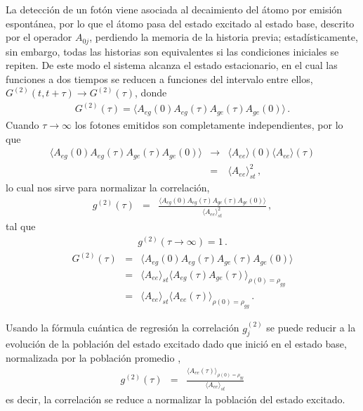 \documentclass[twocolumn,aps,eqsecnum,showkeys,amsmath]{revtex4}
\begin{document}
La detecci\'on de un fot\'on viene asociada al decaimiento del \'atomo por 
emisi\'on espont\'anea, por lo que el \'atomo pasa del estado excitado al 
estado base, descrito por el operador $A_{0j}$, perdiendo la memoria de la 
historia previa; estad\'isticamente, sin embargo, todas las historias son 
equivalentes si las condiciones iniciales se repiten. De este modo el sistema 
alcanza el estado estacionario, en el cual las funciones a dos tiempos se 
reducen a funciones del intervalo entre ellos, 
$G^{(2)} (t,t+\tau) \to G^{(2)} (\tau)$,  donde 
%
\begin{eqnarray}
G^{(2)} (\tau) 
	= \langle A_{eg} (0) A_{eg} (\tau)  A_{ge} (\tau) A_{ge} (0) \rangle \,.
\end{eqnarray} 	
Cuando $\tau \to \infty$ los fotones emitidos son completamente 
independientes, por lo que 
%
\begin{eqnarray}
\langle A_{eg} (0) A_{eg} (\tau)  A_{ge} (\tau) A_{ge} (0) \rangle 
	&\to&  \langle A_{ee} \rangle(0) \langle A_{ee} \rangle(\tau) \nonumber \\ 
	&=& \langle A_{ee} \rangle_{st}^2 \,, 
\end{eqnarray} 	
lo cual nos sirve para normalizar la correlaci\'on,
%
\begin{eqnarray}
g^{(2)} (\tau) 
	&=& \frac{ \langle A_{eg} (0) A_{eg} (\tau)  A_{ge} (\tau) A_{ge} (0) \rangle }
	{ \langle A_{ee} \rangle_{st}^2 } \,, 
\end{eqnarray} 	
tal que  
%
\begin{eqnarray} 
g^{(2)} (\tau \to \infty) = 1 \,. 
\end{eqnarray} 	 
%
\begin{eqnarray}
G^{(2)} (\tau) 
	&=& \langle A_{eg} (0) A_{eg} (\tau)  A_{ge} (\tau) A_{ge} (0) \rangle 	
		\nonumber \\
	&=& \langle A_{ee} \rangle_{st} 
	 \langle A_{eg} (\tau)  A_{ge} (\tau) \rangle_{\rho(0)=\rho_{gg}} 
	 	\nonumber\\ 
	&=& \langle A_{ee} \rangle_{st}  
	\langle A_{ee} (\tau) \rangle_{\rho(0)=\rho_{gg}} \,.
\end{eqnarray} 	

Usando la f\'ormula cu\'antica de regresi\'on la correlaci\'on $g_j^{(2)}$ se 
puede reducir a la evoluci\'on de la poblaci\'on del estado excitado dado que 
inici\'o en el estado base, normalizada por la poblaci\'on promedio 
\cite{Carmichael02}, 
%
\begin{eqnarray}
g^{(2)} (\tau) &=& \frac{ \langle A_{ee} (\tau)\rangle_{\rho(0)=\rho_{gg}} }
	{ \langle A_{ee} \rangle_{st} }
\end{eqnarray}
es decir, la correlaci\'on se reduce a normalizar la poblaci\'on del estado 
excitado. 
\end{document}
